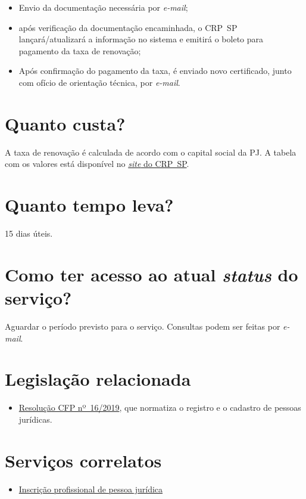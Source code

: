 \begin{itemize}
  \item  Envio da documentação necessária por \emph{e-mail};
  \item  após verificação da documentação encaminhada, o CRP~SP  lançará/atualizará a informação no sistema e emitirá o boleto para  pagamento da taxa de renovação;
  \item  Após confirmação do pagamento da taxa, é enviado novo certificado,  junto com ofício de orientação técnica, por \emph{e-mail}.
\end{itemize}

\section{Quanto custa?}

A taxa de renovação é calculada de acordo com o capital social da PJ. A tabela com os valores está disponível no \href{https://www.crpsp.org/pagina/view/207}{\emph{site} do CRP~SP}.

\section{Quanto tempo leva?}

15 dias úteis.

\section{Como ter acesso ao atual \emph{status} do serviço?}
Aguardar o período previsto para o serviço. Consultas podem ser feitas por \emph{e-mail}.

\section{Legislação relacionada}

\begin{itemize}
  \item  \href{https://atosoficiais.com.br/cfp/resolucao-administrativa-financeira-n-16-2019-altera-o-manual-de-procedimentos-administrativo-e-financeiro-do-sistema-conselhos-de-psicologia-anexo-da-resolucao-cfp-n-202018-a-resolucao-cfp-n-03-2007-a-resolucao-cfp-n-16-2019-e-da-outras-providencias}{Resolução  CFP nº~16/2019}, que normatiza o registro e o cadastro de pessoas  jurídicas.
\end{itemize}

\section{Serviços correlatos}

\begin{itemize}
  \item  \hyperref[chap:pj-inscricao]{Inscrição  profissional de pessoa jurídica}
\end{itemize}

\sumario